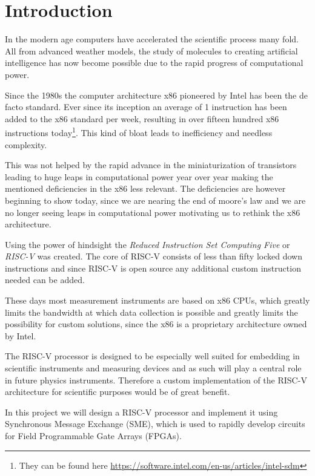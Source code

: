 \chapter{Introduction}
    In the modern age computers have accelerated the scientific process many fold. All from advanced weather models, the study of molecules to creating artificial intelligence has now become possible due to the rapid progress of computational power.
    
    Since the 1980s the computer architecture x86 pioneered by Intel has been the de facto standard. 
    Ever since its inception an average of 1 instruction has been added to the x86 standard per week, resulting in over fifteen hundred x86 instructions today\footnote{They can be found here \url{https://software.intel.com/en-us/articles/intel-sdm}}. This kind of bloat leads to inefficiency and needless complexity.
    
    This was not helped by the rapid advance in the miniaturization of transistors leading to huge leaps in computational power year over year making the mentioned deficiencies in the x86 less relevant. The deficiencies are however beginning to show today, since we are nearing the end of moore’s law and we are no longer seeing leaps in computational power motivating us to rethink the x86 architecture.
    
    Using the power of hindsight the \textit{Reduced Instruction Set Computing Five} or \textit{RISC-V} was created. The core of RISC-V consists of less than fifty locked down instructions and since RISC-V is open source any additional custom instruction needed can be added.
    
    
    These days most measurement instruments are based on x86 CPUs, which greatly limits the bandwidth at which data collection is possible and greatly limits the possibility for custom solutions, since the x86 is a proprietary architecture owned by Intel. 
    
    The RISC-V processor is designed to be especially well suited for embedding in scientific instruments and measuring devices and as such will play a central role in future physics instruments.
    Therefore a custom implementation of the RISC-V architecture for scientific purposes would be of great benefit. 
    
    In this project we will design a RISC-V processor and implement it using Synchronous Message Exchange (SME), which is used to rapidly develop circuits for Field Programmable Gate Arrays (FPGAs).